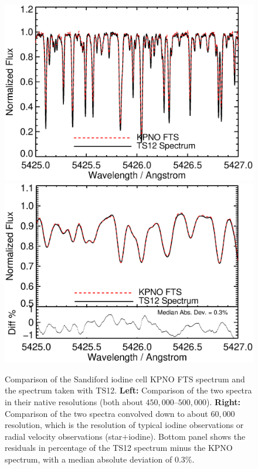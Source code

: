 \begin{figure}[!th]
\includegraphics[angle=0.,scale=0.33]{het/chunk_5425A_original_sclrem.eps}
\includegraphics[angle=0.,scale=0.33]{het/chunk_5425A_60k_gaus_sclrem_diff.eps}
\caption{Comparison of the Sandiford iodine cell KPNO FTS spectrum and
  the spectrum taken with TS12. \textbf{Left:} Comparison of the two
  spectra in their native resolutions (both about
  $450,000$--$500,000$). \textbf{Right:} Comparison of the two spectra
  convolved down to about $60,000$ resolution, which is the resolution
  of typical iodine observations or radial velocity observations
  (star$+$iodine). Bottom panel shows the residuals in percentage of
  the TS12 spectrum minus the KPNO spectrum, with a median absolute
  deviation of 0.3\%.
  \label{fig:ts12}}
\end{figure}

